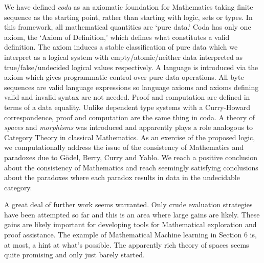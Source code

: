 \documentclass[11pt]{article}
\begin{document}
We have defined {\it coda} as an axiomatic foundation for Mathematics taking finite sequence as the starting point, rather than starting with logic, sets or types.  
In this framework, all mathematical quantities are `pure data.'  Coda has only one axiom, the `Axiom of Definition,' which defines 
what constitutes a valid definition.  The axiom induces a stable classification of pure data which we interpret as a logical system with 
empty/atomic/neither data interpreted as true/false/undecided logical values respectively.  A language is introduced via the axiom which 
gives programmatic control over pure data operations.  All byte sequences are valid language expressions so language axioms and 
axioms defining valid and invalid syntax are not needed.  Proof and computation are defined in terms of a data equality.  Unlike 
dependent type systems with a Curry-Howard correspondence, proof and computation are the same thing in coda.  A theory of {\it spaces} and 
{\it morphisms} was introduced and apparently plays a role analogous to Category Theory in classical 
Mathematics.  As an exercise of the proposed logic, we computationally address the issue of the consistency of Mathematics and paradoxes 
due to G\"odel, Berry, Curry and Yablo.  We reach a positive conclusion about the consistency of Mathematics and reach seemingly 
satisfying conclusions about the paradoxes where each paradox results in data in the undecidable category.  

    A great deal of further work seems warranted.  Only crude evaluation strategies have been attempted so far and this is an area 
where large gains are likely.  These gains are likely important for developing tools for Mathematical exploration and proof assistance.  
The example of Mathematical Machine learning in Section 6 is, at most, a hint at what's possible.  The apparently rich theory 
of spaces seems quite promising and only just barely started.  
\end{document}
